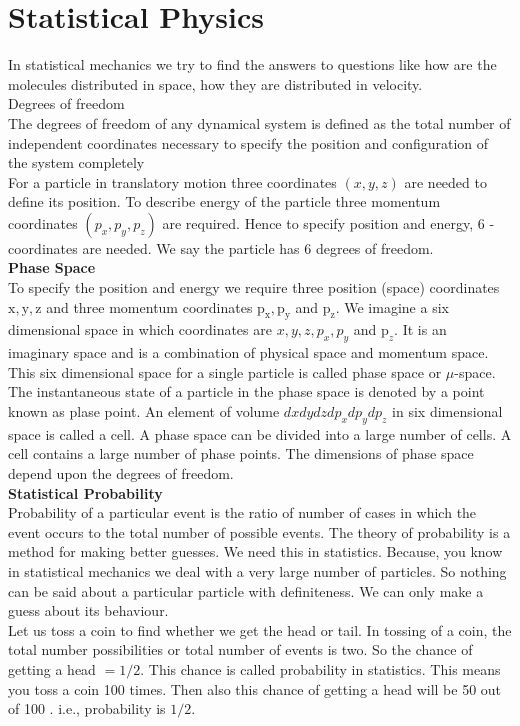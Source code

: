 \chapter{Statistical Physics}
In statistical mechanics we try to find the answers to questions like how are the molecules distributed in space, how they are distributed in velocity.\\
Degrees of freedom\\
The degrees of freedom of any dynamical system is defined as the total number of independent coordinates necessary to specify the position and configuration of the system completely\\
For a particle in translatory motion three coordinates $(x, y, z)$ are needed to define its position. To describe energy of the particle three momentum coordinates $\left(p_{x}, p_{y}, p_{z}\right)$ are required. Hence to specify position and energy, 6 -coordinates are needed. We say the particle has 6 degrees of freedom.\\
\textbf{Phase Space}\\
To specify the position and energy we require three position (space) coordinates $\mathrm{x}, \mathrm{y}, \mathrm{z}$ and three momentum coordinates $\mathrm{p}_{\mathrm{x}}, \mathrm{p}_{\mathrm{y}}$ and $\mathrm{p}_{\mathrm{z}}$. We imagine a six dimensional space in which coordinates are $x, y, z, p_{x}, p_{y}$ and $\mathrm{p}_{z}$. It is an imaginary space and is a combination of physical space and momentum space. This six dimensional space for a single particle is called phase space or $\mu$-space. The instantaneous state of a particle in the phase space is denoted by a point known as plase point. An element of volume $d x d y d z d p_{x} d p_{y} d p_{z}$ in six dimensional space is called a cell. A phase space can be divided into a large number of cells. A cell contains a large number of phase points. The dimensions of phase space depend upon the degrees of freedom.\\
\textbf{Statistical Probability}\\
Probability of a particular event is the ratio of number of cases in which the event occurs to the total number of possible events. The theory of probability is a method for making better guesses. We need this in statistics. Because, you know in statistical mechanics we deal with a very large number of particles. So nothing can be said about a particular particle with definiteness. We can only make a guess about its behaviour.\\
Let us toss a coin to find whether we get the head or tail. In tossing of a coin, the total number possibilities or total number of events is two. So the chance of getting a head $=1 / 2$. This chance is called probability in statistics. This means you toss a coin 100 times. Then also this chance of getting a head will be 50 out of 100 . i.e., probability is $1 / 2$.\\
